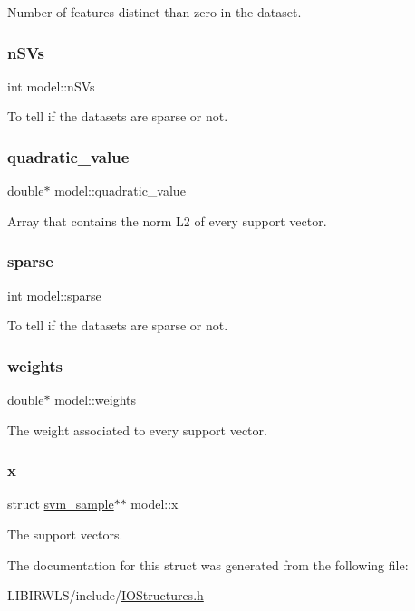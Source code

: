 Number of features distinct than zero in the dataset. \hypertarget{structmodel_a3b73d79940bbdae365676c4fa56e96ea}{}\label{structmodel_a3b73d79940bbdae365676c4fa56e96ea} 
\subsubsection{\texorpdfstring{n\+S\+Vs}{nSVs}}
{\ttfamily int model\+::n\+S\+Vs}

To tell if the datasets are sparse or not. \hypertarget{structmodel_a623da3d1f5116fd4d66873b95eb2e720}{}\label{structmodel_a623da3d1f5116fd4d66873b95eb2e720} 
\subsubsection{\texorpdfstring{quadratic\+\_\+value}{quadratic\_value}}
{\ttfamily double$\ast$ model\+::quadratic\+\_\+value}

Array that contains the norm L2 of every support vector. \hypertarget{structmodel_ad00b5b9bbafcd18eb6367c90d9471231}{}\label{structmodel_ad00b5b9bbafcd18eb6367c90d9471231} 
\subsubsection{\texorpdfstring{sparse}{sparse}}
{\ttfamily int model\+::sparse}

To tell if the datasets are sparse or not. \hypertarget{structmodel_a658dab89d4b4b1a5bd28cdfb4abafe39}{}\label{structmodel_a658dab89d4b4b1a5bd28cdfb4abafe39} 
\subsubsection{\texorpdfstring{weights}{weights}}
{\ttfamily double$\ast$ model\+::weights}

The weight associated to every support vector. \hypertarget{structmodel_a81da41c8731f95de344a068d302eb336}{}\label{structmodel_a81da41c8731f95de344a068d302eb336} 
\subsubsection{\texorpdfstring{x}{x}}
{\ttfamily struct \hyperlink{structsvm__sample}{svm\+\_\+sample}$\ast$$\ast$ model\+::x}

The support vectors. 

The documentation for this struct was generated from the following file\+:\begin{DoxyCompactItemize}
\item 
L\+I\+B\+I\+R\+W\+L\+S/include/\hyperlink{IOStructures_8h}{I\+O\+Structures.\+h}\end{DoxyCompactItemize}
